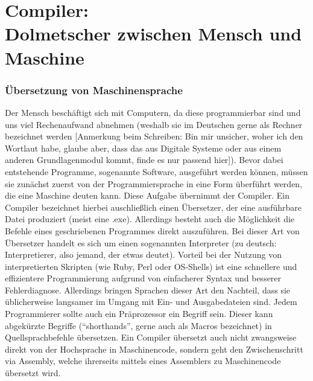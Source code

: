\documentclass{standalone}
\begin{document}


\chapter{Compiler:\\ Dolmetscher zwischen Mensch und Maschine}
\subsection{Übersetzung von Maschinensprache}

Der Mensch beschäftigt sich mit Computern, da diese programmierbar sind und uns viel Rechenaufwand abnehmen (weshalb sie im Deutschen gerne als Rechner bezeichnet werden [Anmerkung beim Schreiben: Bin mir unsicher, woher ich den Wortlaut habe, glaube aber, dass das aus Digitale Systeme oder aus einem anderen Grundlagenmodul kommt, finde es nur passend hier]). 
Bevor dabei entstehende Programme, sogenannte Software, ausgeführt werden können, müssen sie zunächst zuerst von der Programmiersprache in eine Form überführt werden, die eine Maschine deuten kann. Diese Aufgabe übernimmt der Compiler. %
Ein Compiler bezeichnet hierbei auschließlich einen Übersetzer, der eine ausführbare Datei produziert (meist eine .exe). Allerdings besteht auch die Möglichkeit die Befehle eines geschriebenen Programmes direkt auszuführen. Bei dieser Art von Übersetzer handelt es sich um einen sogenannten Interpreter (zu deutsch: Interpretierer, also jemand, der etwas deutet). 
Vorteil bei der Nutzung von interpretierten Skripten (wie Ruby, Perl oder OS-Shells) ist eine schnellere und effizientere Programmierung aufgrund von einfacherer Syntax und besserer Fehlerdiagnose. Allerdings bringen Sprachen dieser Art den Nachteil, dass sie üblicherweise langsamer im Umgang mit Ein- und Ausgabedateien sind. %
Jedem Programmierer sollte auch ein Präprozessor ein Begriff sein. Dieser kann abgekürzte Begriffe (\enquote{shorthands}, gerne auch als Macros bezeichnet) in Quellsprachbefehle übersetzen. 
Ein Compiler übersetzt auch nicht zwangsweise direkt von der Hochsprache in Maschinencode, sondern geht den Zwischenschritt via Assembly, welche ihrerseits mittels eines Assemblers zu Maschinencode übersetzt wird. 
\\
\end{document}
